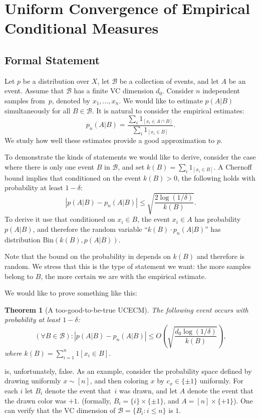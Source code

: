 \documentclass{article}
\def\B{{\mathcal B}}
\newcommand{\cB}{\mathcal{B}}
\newtheorem{theorem}{Theorem}
\begin{document}
\section{Uniform Convergence of Empirical Conditional Measures}
\label{sec:ucecm}


\subsection{Formal Statement}

Let $p$ be a distribution over $X$, let $\cB$ be a collection of events, and let $A$ be an event.
Assume that $\cB$ has a finite VC dimension $d_0$.
Consider $n$ independent samples from~$p$, denoted by $x_1,\ldots,x_n$.
We would like to estimate $p(A \vert B)$ simultaneously for all $B\in \B$.
It is natural to consider the empirical estimates:
\[p_n(A\vert B)=\frac{\sum_i 1_{[x_i\in A \cap B]}}{\sum_i 1_{[x_i\in B]}}.\]
We study how well these estimates provide a good approximation to $p$.

To demonstrate the kinds of statements we would like to derive,
consider the case where there is only one event $B$ in $\cB$, 
and set $k(B)=\sum_i 1_{[x_i\in B]}$.
A Chernoff bound implies that conditioned on the event $k(B)>0$, 
the following holds with probability at least $1-\delta$:
\begin{equation}\label{eq:chernoff}
\left\lvert p(A\vert B) - p_n(A \vert B) \right\rvert \leq \sqrt{\frac{2\log(1/\delta)}{k(B)}}.
\end{equation}
To derive it use that conditioned on $x_i\in B$, the event $x_i\in A$ has probability $p(A\vert B)$, 
and therefore the random variable ``$k(B)\cdot p_n(A \vert B)$'' has distribution $\mbox{Bin}(k(B), p(A\vert B))$.

Note that the bound on the probability in  depends on $k(B)$
and therefore is random.
We stress that this is the type of statement we want:
the more samples belong to $B$, the more certain we are with the empirical estimate.

We would like to prove something like this:
\begin{theorem}[A too-good-to-be-true UCECM]\label{thm:toogood}
The following event occurs with probability at least $1-\delta$:
\[\left(\forall B\in\B\right):\left\lvert p(A \vert B) - p_n(A \vert B) \right\rvert \leq O\left(\sqrt{\frac{d_0 \log(1/\delta)}{k(B)}}\right),\]
where $k(B) = \sum_{i=1}^n 1[x_i\in B]$.
\end{theorem}
 is, unfortunately, false. 
As an example, consider the probability space defined by drawing uniformly $x\sim[n]$,
and then coloring $x$ by $c_x\in\{\pm 1\}$ uniformly.
For each $i$ let $B_i$ denote the event that~$i$ was drawn,
and let $A$ denote the event that the drawn color was  $+1$.
(formally, $B_i = \{i\}\times\{\pm 1\}$, and $A=[n]\times\{+1\}$).
One can verify that the VC dimension of $\B=\{B_i : i\leq n\}$ is $1$.
\end{document}
